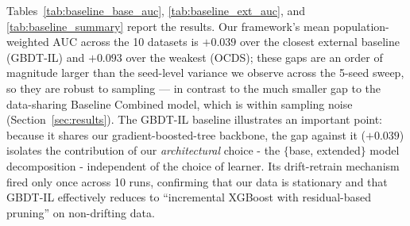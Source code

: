 \documentclass[sigconf]{acmart}
\begin{document}
\begin{itemize}
Tables~\ref{tab:baseline_base_auc}, \ref{tab:baseline_ext_auc}, and \ref{tab:baseline_summary} report the results. Our framework's mean population-weighted AUC across the 10 datasets is $+0.039$ over the closest external baseline (GBDT-IL) and $+0.093$ over the weakest (OCDS); these gaps are an order of magnitude larger than the seed-level variance we observe across the 5-seed sweep, so they are robust to sampling --- in contrast to the much smaller gap to the data-sharing Baseline Combined model, which is within sampling noise (Section~\ref{sec:results}). The GBDT-IL baseline illustrates an important point: because it shares our gradient-boosted-tree backbone, the gap against it ($+0.039$) isolates the contribution of our \textit{architectural} choice - the $\{$base, extended$\}$ model decomposition - independent of the choice of learner. Its drift-retrain mechanism fired only once across 10 runs, confirming that our data is stationary and that GBDT-IL effectively reduces to ``incremental XGBoost with residual-based pruning'' on non-drifting data.


\end{itemize}
\end{document}
